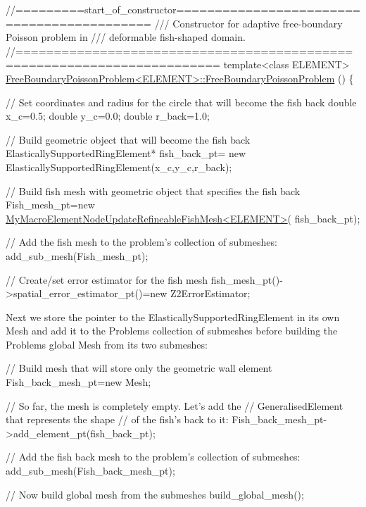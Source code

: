 \begin{DoxyCodeInclude}
\textcolor{comment}{//=========start\_of\_constructor===========================================}
\textcolor{comment}{/// Constructor for adaptive free-boundary Poisson problem in }
\textcolor{comment}{}\textcolor{comment}{/// deformable fish-shaped domain. }
\textcolor{comment}{}\textcolor{comment}{//========================================================================}
\textcolor{keyword}{template}<\textcolor{keyword}{class} ELEMENT>
\hyperlink{classFreeBoundaryPoissonProblem_a0efe7c342eea790fc0240830bc3c4ebc}{FreeBoundaryPoissonProblem<ELEMENT>::FreeBoundaryPoissonProblem}
      ()
\{ 

 \textcolor{comment}{// Set coordinates and radius for the circle that will become the fish back}
 \textcolor{keywordtype}{double} x\_c=0.5;
 \textcolor{keywordtype}{double} y\_c=0.0;
 \textcolor{keywordtype}{double} r\_back=1.0;

 \textcolor{comment}{// Build geometric object that will become the fish back}
 ElasticallySupportedRingElement* fish\_back\_pt=
  \textcolor{keyword}{new} ElasticallySupportedRingElement(x\_c,y\_c,r\_back);

 \textcolor{comment}{// Build fish mesh with geometric object that specifies the fish back }
 Fish\_mesh\_pt=\textcolor{keyword}{new} 
  \hyperlink{classMyMacroElementNodeUpdateRefineableFishMesh}{MyMacroElementNodeUpdateRefineableFishMesh<ELEMENT>}(
      fish\_back\_pt);

 \textcolor{comment}{// Add the fish mesh to the problem's collection of submeshes:}
 add\_sub\_mesh(Fish\_mesh\_pt);

 \textcolor{comment}{// Create/set error estimator for the fish mesh}
 fish\_mesh\_pt()->spatial\_error\_estimator\_pt()=\textcolor{keyword}{new} Z2ErrorEstimator;

\end{DoxyCodeInclude}


Next we store the pointer to the {\ttfamily Elastically\+Supported\+Ring\+Element} in its own Mesh and add it to the {\ttfamily Problem\textquotesingle{}s} collection of submeshes before building the {\ttfamily Problem\textquotesingle{}s} global {\ttfamily Mesh} from its two submeshes\+:


\begin{DoxyCodeInclude}
 \textcolor{comment}{// Build mesh that will store only the geometric wall element}
 Fish\_back\_mesh\_pt=\textcolor{keyword}{new} Mesh;

 \textcolor{comment}{// So far, the mesh is completely empty. Let's add the }
 \textcolor{comment}{// GeneralisedElement that represents the shape}
 \textcolor{comment}{// of the fish's back to it:}
 Fish\_back\_mesh\_pt->add\_element\_pt(fish\_back\_pt);

 \textcolor{comment}{// Add the fish back mesh to the problem's collection of submeshes:}
 add\_sub\_mesh(Fish\_back\_mesh\_pt);

 \textcolor{comment}{// Now build global mesh from the submeshes}
 build\_global\_mesh();

\end{DoxyCodeInclude}


